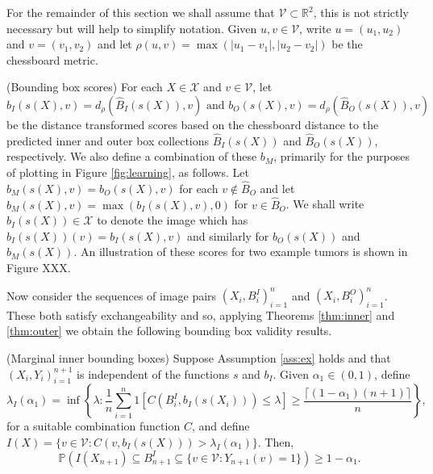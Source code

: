 For the remainder of this section we shall assume that $\mathcal{V} \subset \mathbb{R}^2$, this is not strictly necessary but will help to simplify notation. Given $u,v \in \mathcal{V}$, write $u = (u_1, u_2)$ and $v = (v_1, v_2)$ and let $\rho(u,v) = \max \left( |u_1 - v_1|, |u_2 - v_2| \right)$ be the chessboard metric. 
\begin{definition}\label{dfn:BBS}
	(Bounding box scores) For each $X \in \mathcal{X}$ and $v \in \mathcal{V}$, let
	\begin{equation*}
		b_I(s(X), v) = d_{\rho}(\hat{B}_I(s(X)), v) \text{ and } b_O(s(X), v) = d_{\rho}(\hat{B}_O(s(X)), v) 
	\end{equation*}
be the distance transformed scores based on the chessboard distance to the predicted inner and outer box collections $\hat{B}_I(s(X))$ and $\hat{B}_O(s(X))$, respectively. We also define a combination of these $b_M$, primarily for the purposes of plotting in Figure \ref{fig:learning}, as follows. Let $b_M(s(X), v) = b_O(s(X),v)$ for each $v \not\in \hat{B}_O$ and let $b_M(s(X), v) = \max(b_I(s(X),v), 0) $ for $v \in \hat{B}_O$. We shall write $b_I(s(X)) \in \mathcal{X}$ to denote the image which has $b_I(s(X))(v) = 	b_I(s(X), v)$ and similarly for $b_O(s(X))$ and $b_M(s(X))$. An illustration of these scores for two example tumors is shown in Figure XXX.
\end{definition}
Now consider the sequences of image pairs $(X_i, B_i^I)_{i = 1}^n$ and $(X_i, B_i^O)_{i = 1}^n$. These both satisfy exchangeability and so, applying Theorems \ref{thm:inner} and \ref{thm:outer} we obtain the following bounding box validity results.
\begin{corollary}\label{thm:boxinnergen}
	(Marginal inner bounding boxes)
	Suppose Assumption \ref{ass:ex} holds and that $(X_i, Y_i)_{i = 1}^{n+1}$ is independent of the functions $s$ and $b_I$.  Given $\alpha_1 \in (0,1)$, define 
	\begin{equation}
		\lambda_I(\alpha_1) = \inf\left\lbrace \lambda: \frac{1}{n} \sum_{i = 1}^n 1\left[ C(B^I_i, b_I(s(X_i))) \leq \lambda \right] \geq  \frac{\lceil (1-\alpha_1)(n+1) \rceil}{n} \right\rbrace,
	\end{equation}
	for a suitable combination function $C$, and define $I(X) = \lbrace v \in \mathcal{V}: C(v, b_I(s(X))) >\lambda_I(\alpha_1)  \rbrace $. Then,
	\begin{equation*}\label{eq:probstat}
		\mathbb{P}\left( I(X_{n+1}) \subseteq B^I_{n+1} \subseteq\lbrace v\in \mathcal{V}: Y_{n+1}(v) = 1 \rbrace \right) \geq 1 - \alpha_1.
	\end{equation*}
\end{corollary}
